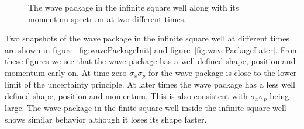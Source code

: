 \documentclass[12pt,a4paper]{article}
\begin{document}
\begin{figure}
\begin{center}
\caption{The wave package in the infinite square well along with its momentum spectrum at two different times.}
\end{center}
\end{figure}

Two snapshots of the wave package in the infinite square well at different times are shown in figure~\ref{fig:wavePackageInit} and figure~\ref{fig:wavePackageLater}. From these figures we see that the wave package has a  well defined shape, position and momentum early on. At time zero $\sigma_x \sigma_p$ for the wave package is close to the lower limit of the uncertainty principle. At later times the wave package has a less well defined shape, position and momentum. This is also consistent with $\sigma_x \sigma_p$ being large. The wave package in the finite square well inside the infinite square well shows similar behavior although it loses its shape faster.
\end{document}
